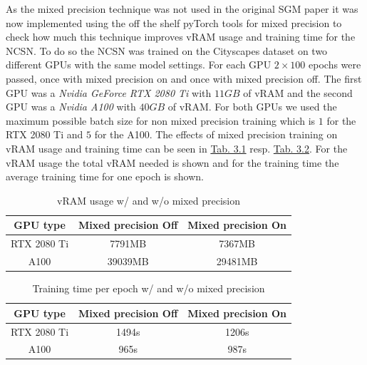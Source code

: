 As the mixed precision technique was not used in the original SGM paper \cite{score_3} it was now implemented using the off the shelf pyTorch tools for mixed precision to check how much this technique improves vRAM usage and training time for the NCSN. To do so the NCSN was trained on the Cityscapes dataset on two different GPUs with the same model settings. For each GPU $2\times100$ epochs were passed, once with mixed precision on and once with mixed precision off. The first GPU was a \textit{Nvidia GeForce RTX 2080 Ti} with $11GB$ of vRAM and the second GPU was a \textit{Nvidia A100} with $40GB$ of vRAM. For both GPUs we used the maximum possible batch size for non mixed precision training which is $1$ for the RTX 2080 Ti and $5$ for the A100. The effects of mixed precision training on vRAM usage and training time can be seen in \hyperref[tab:3.1]{Tab. 3.1} resp. \hyperref[tab:3.1]{Tab. 3.2}. For the vRAM usage the total vRAM needed is shown and for the training time the average training time for one epoch is shown.
%
\begin{table}[] \label{tab:3.1}
        \centering
    \begin{tabular}{c|c|c}
        GPU type        & Mixed precision \textbf{Off}    & Mixed precision \textbf{On} \\
        \hline
        RTX 2080 Ti     &  7791MB               & 7367MB\\
        A100            &  39039MB              & 29481MB
    \end{tabular}
    \caption{vRAM usage w/ and w/o mixed precision}
\end{table}
\begin{table}[b] \label{tab:3.2}
        \centering
    \begin{tabular}{c|c|c}
        GPU type        & Mixed precision \textbf{Off}    & Mixed precision \textbf{On} \\
        \hline
        RTX 2080 Ti     &  1494s                & 1206s    \\
        A100            &  965s                 & 987s
    \end{tabular}
    \caption{Training time per epoch w/ and w/o mixed precision}
\end{table}

